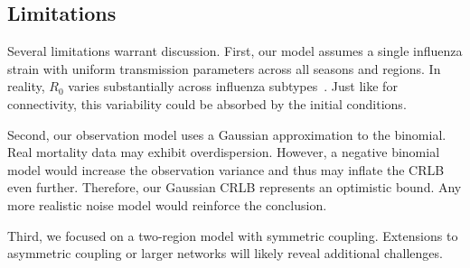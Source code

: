 \documentclass[9pt,twocolumn,twoside]{pnas-new}
\begin{document}
\subsection*{Limitations}
Several limitations warrant discussion. First, our model assumes a
single influenza strain with uniform transmission parameters across
all seasons and regions. In reality, $R_0$ varies substantially across
influenza subtypes~\citep{biggerstaff2014}. Just like for
connectivity, this variability could be absorbed by the initial
conditions.

Second, our observation model uses a Gaussian approximation to the
binomial. Real mortality data may exhibit overdispersion. However, a
negative binomial model would increase the observation variance and
thus may inflate the CRLB even further. Therefore, our Gaussian CRLB
represents an optimistic bound. Any more realistic noise model would
reinforce the conclusion.

Third, we focused on a two-region model with symmetric coupling.
Extensions to asymmetric coupling or larger networks will likely
reveal additional challenges.
\end{document}
